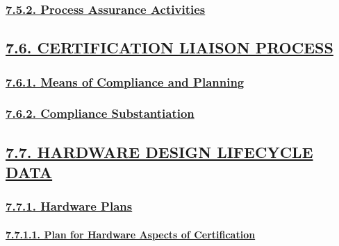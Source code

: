 \documentclass[
]{article}
\begin{document}
\hypertarget{process-assurance-activities}{%
\subsubsection{\texorpdfstring{\protect\hyperlink{process-assurance-activities-1}{7.5.2.
Process Assurance
Activities}}{7.5.2. Process Assurance Activities}}\label{process-assurance-activities}}

\hypertarget{certification-liaison-process}{%
\subsection{\texorpdfstring{\protect\hyperlink{certification-liaison-process-1}{7.6.
CERTIFICATION LIAISON
PROCESS}}{7.6. CERTIFICATION LIAISON PROCESS}}\label{certification-liaison-process}}

\hypertarget{means-of-compliance-and-planning}{%
\subsubsection{\texorpdfstring{\protect\hyperlink{means-of-compliance-and-planning-1}{7.6.1.
Means of Compliance and
Planning}}{7.6.1. Means of Compliance and Planning}}\label{means-of-compliance-and-planning}}

\hypertarget{compliance-substantiation}{%
\subsubsection{\texorpdfstring{\protect\hyperlink{compliance-substantiation-1}{7.6.2.
Compliance
Substantiation}}{7.6.2. Compliance Substantiation}}\label{compliance-substantiation}}

\hypertarget{hardware-design-lifecycle-data}{%
\subsection{\texorpdfstring{\protect\hyperlink{hardware-design-lifecycle-data-1}{7.7.
HARDWARE DESIGN LIFECYCLE
DATA}}{7.7. HARDWARE DESIGN LIFECYCLE DATA}}\label{hardware-design-lifecycle-data}}

\hypertarget{hardware-plans}{%
\subsubsection{\texorpdfstring{\protect\hyperlink{hardware-plans-1}{7.7.1.
Hardware Plans}}{7.7.1. Hardware Plans}}\label{hardware-plans}}

\hypertarget{plan-for-hardware-aspects-of-certification}{%
\paragraph{\texorpdfstring{\protect\hyperlink{plan-for-hardware-aspects-of-certification-1}{7.7.1.1.
Plan for Hardware Aspects of
Certification}}{7.7.1.1. Plan for Hardware Aspects of Certification}}\label{plan-for-hardware-aspects-of-certification}}
\end{document}
